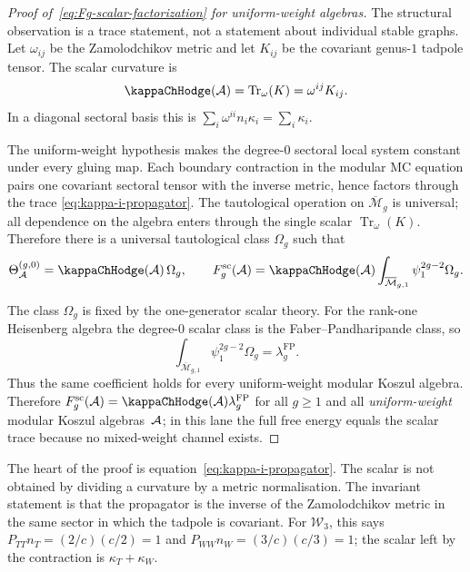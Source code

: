 \begin{proof}[Proof of~\eqref{eq:Fg-scalar-factorization}
for uniform-weight algebras]
The structural observation is a trace statement, not a statement
about individual stable graphs. Let $\omega_{ij}$ be the
Zamolodchikov metric and let $K_{ij}$ be the covariant genus-$1$
tadpole tensor. The scalar curvature is
\begin{equation}\label{eq:kappa-i-propagator}
\kappaChHodge(\cA)=\operatorname{Tr}_{\omega}(K)
=\omega^{ij}K_{ij}.
\end{equation}
In a diagonal sectoral basis this is
$\sum_i \omega^{ii}n_i\kappa_i=\sum_i\kappa_i$.

The uniform-weight hypothesis makes the degree-$0$ sectoral local
system constant under every gluing map. Each boundary contraction in
the modular MC equation pairs one covariant sectoral tensor with the
inverse metric, hence factors through the trace
\eqref{eq:kappa-i-propagator}. The tautological operation on
\(\overline{\mathcal M}_{g}\) is universal; all dependence on the
algebra enters through the single scalar
\(\operatorname{Tr}_{\omega}(K)\). Therefore there is a universal
tautological class $\Omega_g$ such that
\begin{equation}\label{eq:propagator-contraction-universal}
\Theta^{(g,0)}_\cA=\kappaChHodge(\cA)\,\Omega_g,
\qquad
F_g^{\mathrm{sc}}(\cA)=\kappaChHodge(\cA)\int_{\overline{\mathcal M}_{g,1}}
\psi_1^{2g-2}\Omega_g.
\end{equation}

The class $\Omega_g$ is fixed by the one-generator scalar theory.
For the rank-one Heisenberg algebra the degree-$0$ scalar class is
the Faber--Pandharipande class, so
\[
\int_{\overline{\mathcal M}_{g,1}}\psi_1^{2g-2}\Omega_g
=\lambda_g^{\mathrm{FP}}.
\]
Thus the same coefficient holds for every uniform-weight modular
Koszul algebra.
Therefore $F_g^{\mathrm{sc}}(\cA)=\kappaChHodge(\cA)\lambda_g^{\mathrm{FP}}$
for all $g \geq 1$ and all \emph{uniform-weight} modular Koszul
algebras~$\mathcal{A}$; in this lane the full free energy equals the
scalar trace because no mixed-weight channel exists.
\end{proof}

\begin{remark}
\label{rem:ward-equaliser}
The heart of the proof is equation~\eqref{eq:kappa-i-propagator}.
The scalar is not obtained by dividing a curvature by a metric
normalisation. The invariant statement is that the propagator is the
inverse of the Zamolodchikov metric in the same sector in which the
tadpole is covariant. For $\mathcal W_3$, this says
$P_{TT}n_T=(2/c)(c/2)=1$ and
$P_{WW}n_W=(3/c)(c/3)=1$; the scalar left by the contraction is
$\kappa_T+\kappa_W$.
\end{remark}

